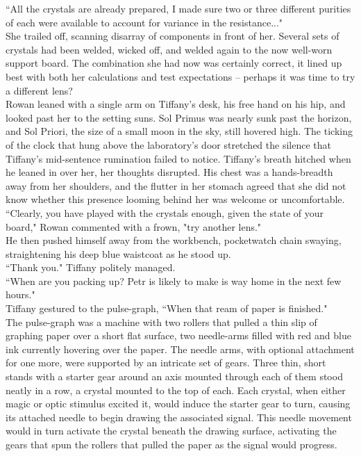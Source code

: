 ``All the crystals are already prepared, I made sure two or three different purities of each were available to account for variance in the resistance..."\\
She trailed off, scanning disarray of components in front of her. 
Several sets of crystals had been welded, wicked off, and welded again to the now well-worn support board.
The combination she had now was certainly correct, it lined up best with both her calculations and test expectations -- perhaps it was time to try a different lens?\\

Rowan leaned with a single arm on Tiffany's desk, his free hand on his hip, and looked past her to the setting suns.
Sol Primus was nearly sunk past the horizon, and Sol Priori, the size of a small moon in the sky, still hovered high.
The ticking of the clock that hung above the laboratory's door stretched the silence that Tiffany's mid-sentence rumination failed to notice.
Tiffany's breath hitched when he leaned in over her, her thoughts disrupted. 
His chest was a hands-breadth away from her shoulders, and the flutter in her stomach agreed that she did not know whether this presence looming behind her was welcome or uncomfortable.\\

``Clearly, you have played with the crystals enough, given the state of your board," Rowan commented with a frown, "try another lens."\\
He then pushed himself away from the workbench, pocketwatch chain swaying, straightening his deep blue waistcoat as he stood up.\\
``Thank you." Tiffany politely managed.\\
``When are you packing up? Petr is likely to make is way home in the next few hours."\\
Tiffany gestured to the pulse-graph, ``When that ream of paper is finished."\\

The pulse-graph was a machine with two rollers that pulled a thin slip of graphing paper over a short flat surface, two needle-arms filled with red and blue ink currently hovering over the paper.
The needle arms, with optional attachment for one more, were supported by an intricate set of gears.
Three thin, short stands with a starter gear around an axis mounted through each of them stood neatly in a row, a crystal mounted to the top of each.
Each crystal, when either magic or optic stimulus excited it, would induce the starter gear to turn, causing its attached needle to begin drawing the associated signal.
This needle movement would in turn activate the crystal beneath the drawing surface, activating the gears that spun the rollers that pulled the paper as the signal would progress.\\

